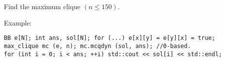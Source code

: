 Find the maximum clique $(n\le 150)$.

Example:
\begin{lstlisting}
BB e[N]; int ans, sol[N]; for (...) e[x][y] = e[y][x] = true;
max_clique mc (e, n); mc.mcqdyn (sol, ans);	//0-based.
for (int i = 0; i < ans; ++i) std::cout << sol[i] << std::endl;
\end{lstlisting}


